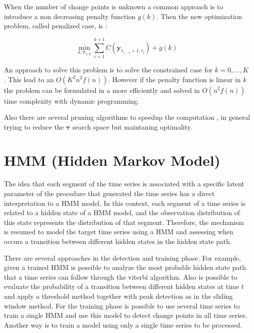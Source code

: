 When the number of change points is unknown a common approach is to introduce a non decreasing penalty function $g(k)$. Then the new optimization problem, called penalized case, is \cite{optimal_detection_of_changepoints_with_a_linear_computational_cost}:

\begin{equation}
    \min_{k, \boldsymbol \tau_{1 : k}} \sum \limits_{i = 1}^{k + 1} C(\mathbf{y}_{\tau_{i - 1} + 1 : \tau_{i}}) + g(k)
\end{equation}

An approach to solve this problem is to solve the constrained case for $k = 0, ..., K$. This lead to an $O(K^{2} n^{2} f(n))$. However if the penalty function is linear in $k$ the problem can be formulated in a more efficiently and solved in $O(n^{2} f(n))$ time complexity with dynamic programming.

Also there are several pruning algorithms to speedup the computation \cite{optimal_detection_of_changepoints_with_a_linear_computational_cost, on_optimal_multiple_changepoint_algorithms_for_large_data}, in general trying to reduce the $\boldsymbol \tau$ search space but maintaning optimality.

\section{HMM (Hidden Markov Model)}

The idea that each segment of the time series is associated with a specific latent parameter of the procedure that generated the time series has a direct interpretation to a HMM model. In this context, each segment of a time series is related to a hidden state of a HMM model, and the observation distribution of this state represents the distribution of that segment. Therefore, the mechanism is resumed to model the target time series using a HMM and assessing when occurs a transition between different hidden states in the hidden state path.

There are several approaches in the detection and training phase. For example, given a trained HMM is possible to analyze the most probable hidden state path that a time series can follow through the viterbi algorithm. Also is possible to evaluate the probability of a transition between different hidden states at time $t$ and apply a threshold method together with peak detection as in the sliding window method. For the training phase is possible to use several time series to train a single HMM and use this model to detect change points in all time series. Another way is to train a model using only a single time series to be processed.

